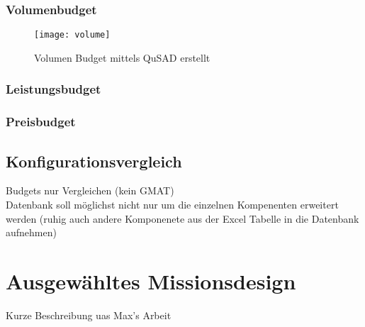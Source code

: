 						\subsubsection{Volumenbudget}
								
										\begin{figure}[h]
											\centering
												\texttt{[image: volume]}
											\caption{Volumen Budget mittels QuSAD erstellt }
											\label{fig:volume}
										\end{figure}
								
						\subsubsection{Leistungsbudget}
						\subsubsection{Preisbudget}
				
				\subsection{Konfigurationsvergleich}
		Budgets nur Vergleichen (kein GMAT) \\
		Datenbank soll möglichst nicht nur um die einzelnen Kompenenten erweitert werden (ruhig auch andere Komponenete aus der Excel Tabelle in die Datenbank aufnehmen)
		
		\section{	Ausgewähltes Missionsdesign}
		Kurze Beschreibung uas Max's Arbeit
				
